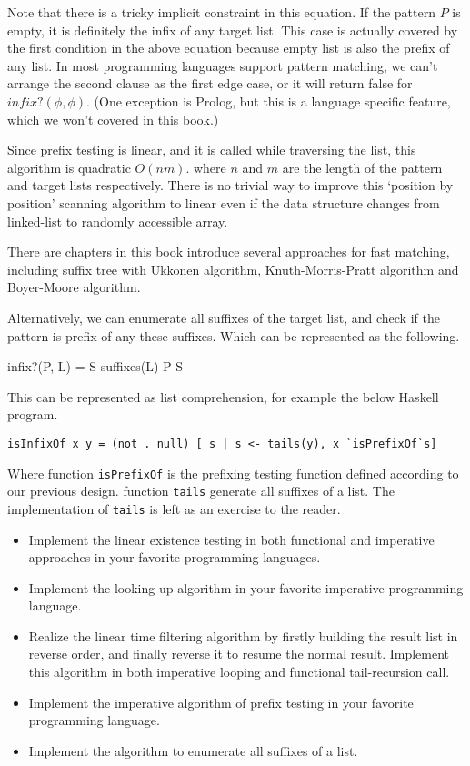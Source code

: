 \documentclass[b5paper]{article}
\begin{document}
Note that there is a tricky implicit constraint in this equation. If the pattern $P$ is empty,
it is definitely the infix of any target list. This case is actually covered by the first condition
in the above equation because empty list is also the prefix of any list. In most programming languages
support pattern matching, we can't arrange the second clause as the first edge case, or it will
return false for $infix?(\phi, \phi)$. (One exception is Prolog, but this is a language specific
feature, which we won't covered in this book.)

Since prefix testing is linear, and it is called while traversing the list, this algorithm
is quadratic $O(nm)$. where $n$ and $m$ are the length of the pattern and target lists respectively.
There is no trivial way to improve this `position by position' scanning algorithm to linear
even if the data structure changes from linked-list to randomly accessible array.

There are chapters in this book introduce several approaches for fast matching, including
suffix tree with Ukkonen algorithm, Knuth-Morris-Pratt algorithm and Boyer-Moore algorithm.

Alternatively, we can enumerate all suffixes of the target list, and check if the pattern
is prefix of any these suffixes. Which can be represented as the following.

\be
infix?(P, L) = \exists S \in suffixes(L) \land P \subseteq S
\ee

This can be represented as list comprehension, for example the below Haskell program.

\lstset{language=Haskell}
\begin{lstlisting}
isInfixOf x y = (not . null) [ s | s <- tails(y), x `isPrefixOf`s]
\end{lstlisting}

Where function \texttt{isPrefixOf} is the prefixing testing function defined according to
our previous design. function \texttt{tails} generate all suffixes of a list. The implementation
of \texttt{tails} is left as an exercise to the reader.

\begin{Exercise}
\begin{itemize}
\item Implement the linear existence testing in both functional and imperative approaches in
your favorite programming languages.
\item Implement the looking up algorithm in your favorite imperative programming language.
\item Realize the linear time filtering algorithm by firstly building the result list in reverse
order, and finally reverse it to resume the normal result. Implement this algorithm in both
imperative looping and functional tail-recursion call.
\item Implement the imperative algorithm of prefix testing in your favorite programming language.
\item Implement the algorithm to enumerate all suffixes of a list.
\end{itemize}
\end{Exercise}
\end{document}
